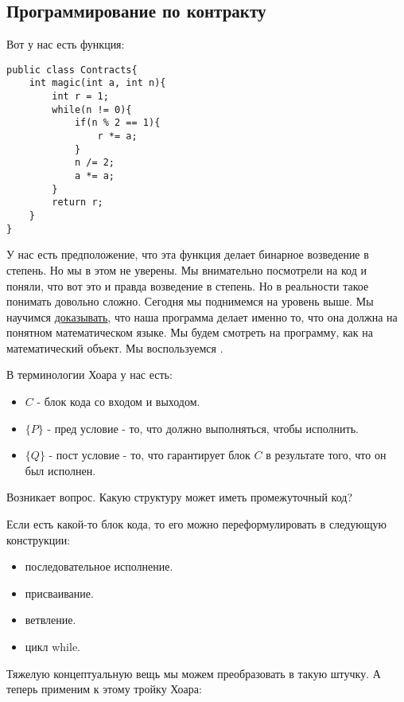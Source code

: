 \subsection{Программирование по контракту}
Вот у нас есть функция:

\begin{verbatim}
public class Contracts{
    int magic(int a, int n){
        int r = 1;
        while(n != 0){
            if(n % 2 == 1){
                r *= a;
            }
            n /= 2;
            a *= a;
        }
        return r;
    }
}
\end{verbatim}

У нас есть предположение, что эта функция делает бинарное возведение в степень. Но мы в этом не уверены. Мы внимательно посмотрели на код и поняли, что вот это и правда возведение в степень. Но в реальности такое понимать довольно сложно. Сегодня мы поднимемся на уровень выше. Мы научимся \uline{доказывать}, что наша программа делает именно то, что она должна на понятном математическом языке.
Мы будем смотреть на программу, как на математический объект. Мы воспользуемся .

В терминологии Хоара у нас есть:

\begin{itemize}
    \item  $C$ - блок кода со входом и выходом. 
    \item $\{ P \}$ - пред условие - то, что должно выполняться, чтобы исполнить.
    \item $\{ Q\}$ -  пост условие - то, что гарантирует блок $C$ в результате того, что он был исполнен.
\end{itemize}

Возникает вопрос. Какую структуру может иметь промежуточный код?


Если есть какой-то блок кода, то его можно переформулировать в следующую конструкции:
\begin{itemize}
    \item последовательное исполнение.
    \item присваивание.
    \item ветвление.
    \item цикл while.
\end{itemize}

Тяжелую концептуальную вещь мы можем преобразовать в такую штучку. А теперь применим к этому тройку Хоара:

